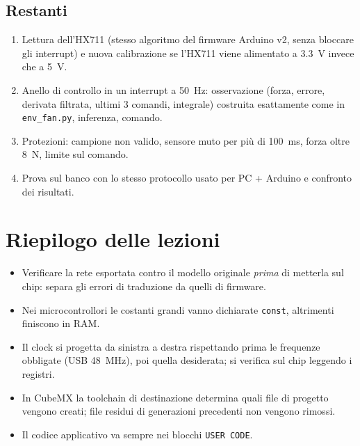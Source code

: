 \documentclass[11pt,a4paper]{article}
\newcommand{\code}[1]{\texttt{\small #1}}
\begin{document}
\subsection{Restanti}
\begin{enumerate}
\item Lettura dell'HX711 (stesso algoritmo del firmware Arduino v2, senza bloccare gli interrupt) e
  nuova calibrazione se l'HX711 viene alimentato a 3.3~V invece che a 5~V.
\item Anello di controllo in un interrupt a 50~Hz: osservazione (forza, errore, derivata filtrata,
  ultimi 3 comandi, integrale) costruita esattamente come in \code{env\_fan.py}, inferenza, comando.
\item Protezioni: campione non valido, sensore muto per più di 100~ms, forza oltre 8~N, limite sul comando.
\item Prova sul banco con lo stesso protocollo usato per PC + Arduino e confronto dei risultati.
\end{enumerate}

\section{Riepilogo delle lezioni}
\begin{itemize}
\item Verificare la rete esportata contro il modello originale \emph{prima} di metterla sul chip:
  separa gli errori di traduzione da quelli di firmware.
\item Nei microcontrollori le costanti grandi vanno dichiarate \code{const}, altrimenti finiscono in RAM.
\item Il clock si progetta da sinistra a destra rispettando prima le frequenze obbligate (USB 48~MHz),
  poi quella desiderata; si verifica sul chip leggendo i registri.
\item In CubeMX la toolchain di destinazione determina quali file di progetto vengono creati; file
  residui di generazioni precedenti non vengono rimossi.
\item Il codice applicativo va sempre nei blocchi \code{USER CODE}.
\end{itemize}
\end{document}
